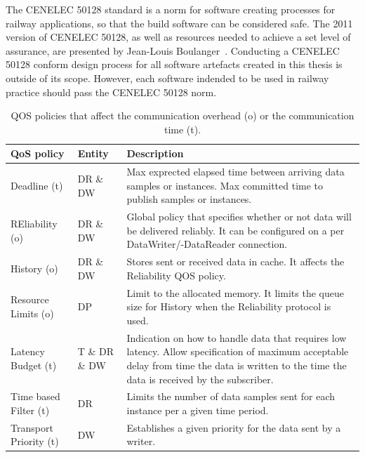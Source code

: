 The CENELEC 50128 standard is a norm for software creating processes for railway applications, so that the build software can be considered safe.
The 2011 version of CENELEC 50128, as well as resources needed to achieve a set level of assurance, are presented by Jean-Louis Boulanger~\cite{BoulangerStandards}.
Conducting a CENELEC 50128 conform design process for all software artefacts created in this thesis is outside of its scope.
However, each software indended to be used in railway practice should pass the CENELEC 50128 norm.
\\

\begin{table}[h!]
	\begin{center}
		\caption{\Gls*{QOS} policies that affect the communication overhead (o) or the communication time (t).}
		\label{tab:qos_garciavalls}
		\begin{tabularx}{\textwidth}{|l|l|X|}
			\hline
			\textbf{QoS policy} & \textbf{Entity} & \textbf{Description}\\
			\hline \hline
			Deadline (t) & DR \& DW & Max exprected elapsed time between arriving data samples or instances. Max committed time to publish samples or instances.\\
			\hline
			REliability (o) & DR \& DW & Global policy that specifies whether or not data will be delivered reliably. It can be configured on a per DataWriter/-DataReader connection. \\
			\hline
			History (o) & DR \& DW & Stores sent or received data in cache. It affects the Reliability \gls*{QOS} policy. \\
			\hline
			Resource Limits (o) & DP & Limit to the allocated memory. It limits the queue size for History when the Reliability protocol is used. \\
			\hline
			Latency Budget (t) & T \& DR \& DW & Indication on how to handle data that requires low latency. Allow specification of maximum acceptable delay from time the data is written to the time the data is received by the subscriber. \\
			\hline
			Time based Filter (t) & DR & Limits the number of data samples sent for each instance per a given time period. \\
			\hline
			Transport Priority (t) & DW & Establishes a given priority for the data sent by a writer.\\
			\hline
		\end{tabularx}
	\end{center}
\end{table}

